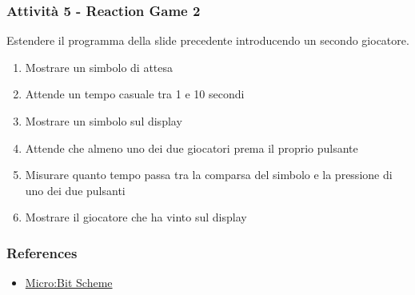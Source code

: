 \documentclass{beamer}
\begin{document}
\begin{frame}
	\frametitle{Attività 5 - Reaction Game 2}
	Estendere il programma della slide precedente introducendo un secondo giocatore.\\
	
	\vspace{2em}
	\begin{enumerate}
		\item Mostrare un simbolo di attesa
		\item Attende un tempo casuale tra 1 e 10 secondi
		\item Mostrare un simbolo sul display
		\item Attende che almeno uno dei due giocatori prema il proprio pulsante
		\item Misurare quanto tempo passa tra la comparsa del simbolo e la pressione di uno dei due pulsanti
		\item Mostrare il giocatore che ha vinto sul display
	\end{enumerate}	
\end{frame}

\begin{frame}
	\frametitle{References}
	\begin{itemize}
		\item \href{https://microbit.org/get-started/user-guide/overview/}{Micro:Bit Scheme}
	\end{itemize}
\end{frame}
\end{document}
